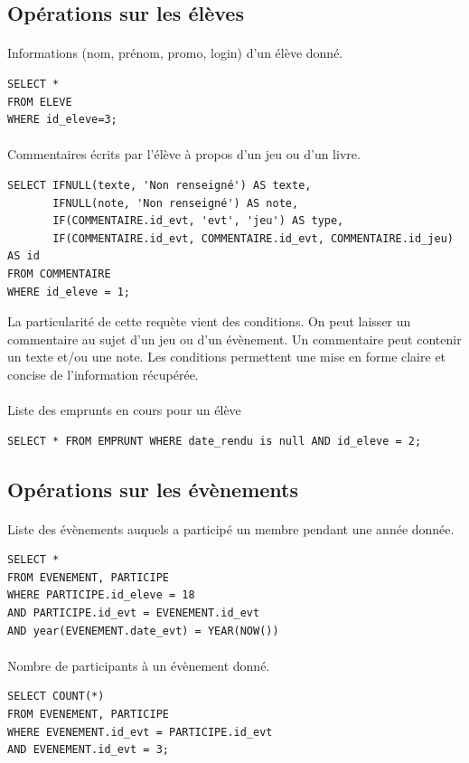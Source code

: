 \documentclass[a4paper, 11pt]{article}
\begin{document}
\subsection{Opérations sur les élèves}
\paragraph{}
Informations (nom, prénom, promo, login) d'un élève donné.
\begin{verbatim}
SELECT *
FROM ELEVE 
WHERE id_eleve=3;
\end{verbatim}
\paragraph{}
Commentaires écrits par l'élève à propos d'un jeu ou d'un livre.
\begin{verbatim}
SELECT IFNULL(texte, 'Non renseigné') AS texte,
       IFNULL(note, 'Non renseigné') AS note,
       IF(COMMENTAIRE.id_evt, 'evt', 'jeu') AS type, 
       IF(COMMENTAIRE.id_evt, COMMENTAIRE.id_evt, COMMENTAIRE.id_jeu) AS id
FROM COMMENTAIRE
WHERE id_eleve = 1;
\end{verbatim}
La particularité de cette requète vient des conditions. On peut laisser un commentaire au sujet d'un jeu ou d'un évènement. Un commentaire peut contenir un texte et/ou une note. Les conditions permettent une mise en forme claire et concise de l'information récupérée.
\paragraph{}
Liste des emprunts en cours pour un élève
\begin{verbatim}
SELECT * FROM EMPRUNT WHERE date_rendu is null AND id_eleve = 2;
\end{verbatim}
\subsection{Opérations sur les évènements}
\paragraph{}
Liste des évènements auquels a participé un membre pendant une année donnée.
\begin{verbatim}
SELECT *
FROM EVENEMENT, PARTICIPE
WHERE PARTICIPE.id_eleve = 18
AND PARTICIPE.id_evt = EVENEMENT.id_evt
AND year(EVENEMENT.date_evt) = YEAR(NOW())
\end{verbatim}
\paragraph{}
Nombre de participants à un évènement donné.
\begin{verbatim}
SELECT COUNT(*)
FROM EVENEMENT, PARTICIPE
WHERE EVENEMENT.id_evt = PARTICIPE.id_evt
AND EVENEMENT.id_evt = 3;
\end{verbatim}
\end{document}
